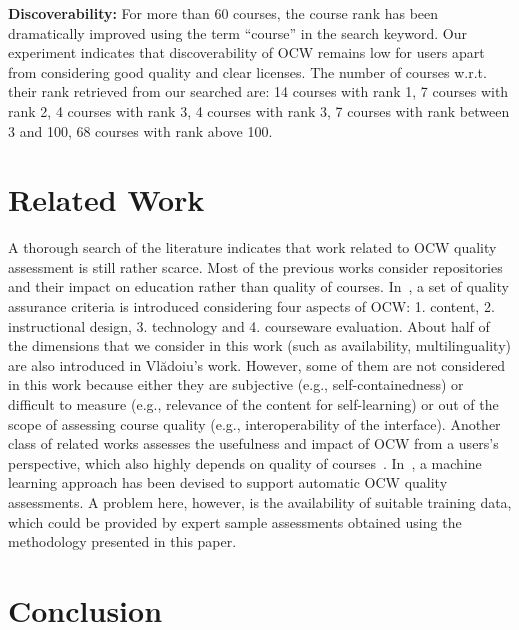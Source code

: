 \documentclass{sig-alternate}
\theoremstyle{definition}
\begin{document}
\noindent\textbf{Discoverability:}
For more than 60 courses, the course rank has been dramatically improved using the term ``course'' in the search keyword.
Our experiment indicates that discoverability of OCW remains low for users apart from considering good quality and clear licenses.
The number of courses w.r.t. their rank retrieved from our searched are:
14 courses with rank 1, 
7 courses with rank 2,
4 courses with rank 3,
4 courses with rank 3,
7 courses with rank between 3 and 100,
68 courses with rank above 100.



\noindent\section{Related Work}
\label{sec:background-work}

A thorough search of the literature indicates that work related to OCW quality assessment is still rather scarce.
Most of the previous works consider repositories and their impact on education rather than quality of courses.
In~\parencite{Vladoiu.2014a}, a set of quality assurance criteria is introduced considering four aspects of OCW: 1. content, 2. instructional design, 3. technology and 4. courseware evaluation.
About half of the dimensions that we consider in this work (such as availability, multilinguality) are also introduced in Vl{\u a}doiu's work.
However, some of them are not considered in this work because either they are subjective (e.g., self-containedness) or difficult to measure (e.g., relevance of the content for self-learning) or out of the scope of assessing course quality (e.g., interoperability of the interface).
Another class of related works assesses the usefulness and impact of OCW from a users's perspective, which also highly depends on quality of courses~\parencite{Chang.2014,Olufunke.2014}.
In~\parencite{Moise.2014}, a machine learning approach has been devised to support automatic OCW quality assessments.
A problem here, however, is the availability of suitable training data, which could be provided by expert sample assessments obtained using the methodology presented in this paper.

\noindent\section{Conclusion}
\label{sec:Con-Recom}
\end{document}
